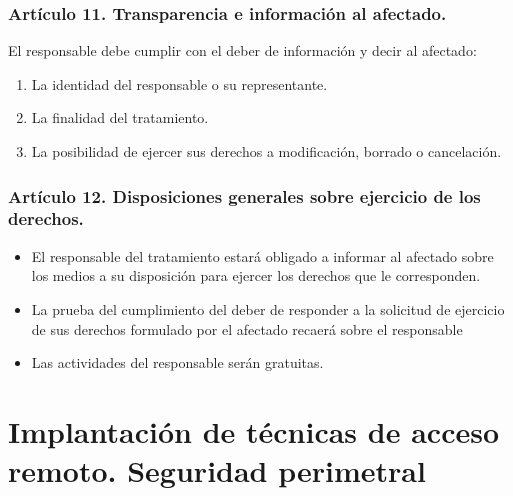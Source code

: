 \documentclass[letterpaper,10pt,spanish]{sphinxmanual}
\begin{document}
\subsection{Artículo 11. Transparencia e información al afectado.}
\label{\detokenize{tema_lopd/tema_lopd:articulo-11-transparencia-e-informacion-al-afectado}}
El responsable debe cumplir con el deber de información y decir al afectado:
\begin{enumerate}
\def\theenumi{\arabic{enumi}}
\def\labelenumi{\theenumi .}
\makeatletter\def\p@enumii{\p@enumi \theenumi .}\makeatother
\item {} 
La identidad del responsable o su representante.

\item {} 
La finalidad del tratamiento.

\item {} 
La posibilidad de ejercer sus derechos a modificación, borrado o cancelación.

\end{enumerate}


\subsection{Artículo 12. Disposiciones generales sobre ejercicio de los derechos.}
\label{\detokenize{tema_lopd/tema_lopd:articulo-12-disposiciones-generales-sobre-ejercicio-de-los-derechos}}\begin{itemize}
\item {} 
El responsable del tratamiento estará obligado a informar al afectado sobre los medios a su disposición para ejercer los derechos que le corresponden.

\item {} 
La prueba del cumplimiento del deber de responder a la solicitud de ejercicio de sus derechos formulado por el afectado recaerá sobre el responsable

\item {} 
Las actividades del responsable serán gratuitas.

\end{itemize}


\chapter{Implantación de técnicas de acceso remoto. Seguridad perimetral}
\label{\detokenize{tema_acceso_remoto/tema_acceso_remoto:implantacion-de-tecnicas-de-acceso-remoto-seguridad-perimetral}}\label{\detokenize{tema_acceso_remoto/tema_acceso_remoto::doc}}
\end{document}
